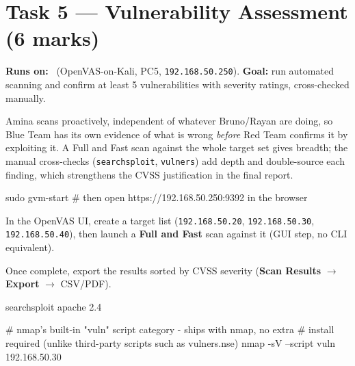 \documentclass[11pt,a4paper]{article}
\begin{document}
\clearpage

\section{Task 5 --- Vulnerability Assessment (6 marks)}
\textbf{Runs on:} \amina\ (OpenVAS-on-Kali, PC5, \texttt{192.168.50.250}).
\quad\textbf{Goal:} run automated scanning and confirm at least 5 vulnerabilities with
severity ratings, cross-checked manually.

\begin{bluebox}
Amina scans proactively, independent of whatever Bruno/Rayan are doing, so Blue Team
has its own evidence of what is wrong \emph{before} Red Team confirms it by exploiting
it. A Full and Fast scan against the whole target set gives breadth; the manual
cross-checks (\texttt{searchsploit}, \texttt{vulners}) add depth and double-source each
finding, which strengthens the CVSS justification in the final report.
\end{bluebox}

\begin{cmdbox}
\begin{cmdverb}
sudo gvm-start
# then open https://192.168.50.250:9392 in the browser
\end{cmdverb}
\end{cmdbox}

\begin{steps}
\item In the OpenVAS UI, create a target list (\texttt{192.168.50.20},
  \texttt{192.168.50.30}, \texttt{192.168.50.40}), then launch a \textbf{Full and Fast}
  scan against it (GUI step, no CLI equivalent).
\item Once complete, export the results sorted by CVSS severity (\textbf{Scan Results}
  $\to$ \textbf{Export} $\to$ CSV/PDF).
\end{steps}

\begin{cmdbox}
\begin{cmdverb}
searchsploit apache 2.4

# nmap's built-in "vuln" script category - ships with nmap, no extra
# install required (unlike third-party scripts such as vulners.nse)
nmap -sV --script vuln 192.168.50.30
\end{cmdverb}
\end{cmdbox}
\end{document}
